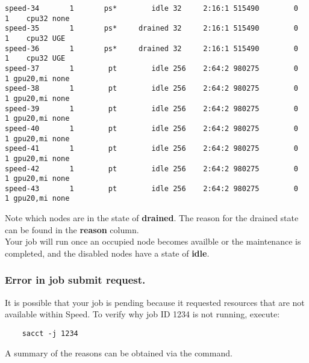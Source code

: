 \begin{verbatim}
speed-34       1       ps*        idle 32     2:16:1 515490        0      1    cpu32 none
speed-35       1       ps*     drained 32     2:16:1 515490        0      1    cpu32 UGE
speed-36       1       ps*     drained 32     2:16:1 515490        0      1    cpu32 UGE
speed-37       1        pt        idle 256    2:64:2 980275        0      1 gpu20,mi none
speed-38       1        pt        idle 256    2:64:2 980275        0      1 gpu20,mi none
speed-39       1        pt        idle 256    2:64:2 980275        0      1 gpu20,mi none
speed-40       1        pt        idle 256    2:64:2 980275        0      1 gpu20,mi none
speed-41       1        pt        idle 256    2:64:2 980275        0      1 gpu20,mi none
speed-42       1        pt        idle 256    2:64:2 980275        0      1 gpu20,mi none
speed-43       1        pt        idle 256    2:64:2 980275        0      1 gpu20,mi none
\end{verbatim}
\normalsize

\noindent Note which nodes are in the state of \textbf{drained}.
The reason for the drained state can be found in the \textbf{reason} column.\\

\noindent Your job will run once an occupied node becomes availble or the maintenance is completed, 
and the disabled nodes have a state of \textbf{idle}.

\subsubsection{Error in job submit request.}

It is possible that your job is pending because it requested resources that are not available within Speed. 
To verify why job ID 1234 is not running, execute:
\begin{verbatim} 
	sacct -j 1234
\end{verbatim}

\noindent A summary of the reasons can be obtained via the  command.
